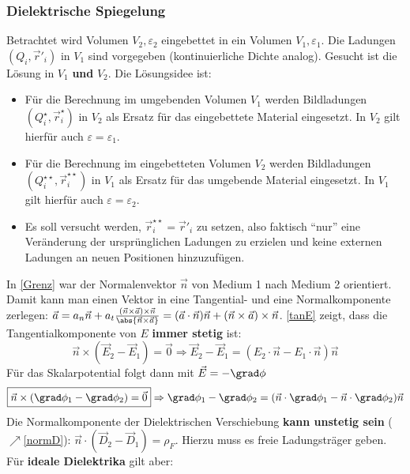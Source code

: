 		  \subsubsection{Dielektrische Spiegelung}
		  	 Betrachtet wird Volumen $V_2, \varepsilon_2$ eingebettet in ein Volumen $V_1,\varepsilon_1$. Die Ladungen $(Q_i, \vec{r}' _i)$ in $V_1$ sind vorgegeben (kontinuierliche Dichte analog). Gesucht ist die Lösung in $V_1$ \textbf{und} $V_2$. Die Lösungsidee ist:
		  	\begin{itemize}
		  		\item Für die Berechnung im umgebenden Volumen $V_1$ werden Bildladungen $(Q_i^\star, \vec{r} _i^\star)$ in $V_2$ als Ersatz für das eingebettete Material eingesetzt. In $V_2$ gilt hierfür auch $\varepsilon = \varepsilon_1$.
		  		\item Für die Berechnung im eingebetteten Volumen $V_2$ werden Bildladungen $(Q_i^{\star\star}, \vec{r} _i^{\star\star})$ in $V_1$ als Ersatz für das umgebende Material eingesetzt. In $V_1$ gilt hierfür auch $\varepsilon = \varepsilon_2$.
		  		\item Es soll versucht werden, $\vec{r} _i^{\star\star} = \vec{r}' _i$ zu setzen, also faktisch \enquote{nur} eine Veränderung der ursprünglichen Ladungen zu erzielen und keine externen Ladungen an neuen Positionen hinzuzufügen.
		  	\end{itemize}
		  
		  	In \ref{Grenz} war der Normalenvektor $\vec{n}$ von Medium 1 nach Medium 2 orientiert. Damit kann man einen Vektor in eine Tangential- und eine Normalkomponente zerlegen:
		  	 $\vec{a} = a_n \vec{n} + a_t \frac{(\vec{n}\times \vec{a})\times\vec{n}}{\abs{\vec{n}\times \vec{a}}} = (\vec{a}\cdot\vec{n}) \vec{n} + (\vec{n}\times \vec{a})\times\vec{n}$.
		  	 \ref{tanE} zeigt, dass die Tangentialkomponente von $E$ \textbf{immer stetig} ist:
		  	\begin{equation}
		  		\boxed{\vec{n} \times \left( \vec{E}_2 - \vec{E}_1\right) = \vec{0}} \Rightarrow \vec{E}_2 - \vec{E}_1 = (E_2\cdot\vec{n} - E_1\cdot\vec{n}) \vec{n}
		  	\end{equation}
		  	 Für das Skalarpotential folgt dann mit $\vec{E} = -\grad \phi$
		  	\begin{equation}\label{tanEpot}
		  		\boxed{\vec{n} \times \left( \grad \phi_1 - \grad \phi_2\right) = \vec{0}} \Rightarrow \grad \phi_1 - \grad \phi_2 = (\vec{n}\cdot\grad \phi_1 - \vec{n}\cdot\grad \phi_2) \vec{n}
		  	\end{equation}
		  	 Die Normalkomponente der Dielektrischen Verschiebung \textbf{kann unstetig sein} ($\nearrow$\ref{normD}): $\vec{n}\cdot (\vec{D} _2 - \vec{D} _1 ) = \rho_F$.  Hierzu muss es freie Ladungsträger geben. Für \textbf{ideale Dielektrika} gilt aber:
